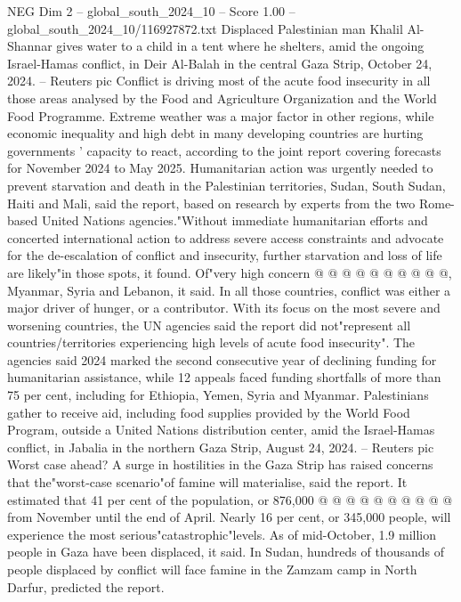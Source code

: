 \begin{textsample}{NEG Dim 2 – global\_south\_2024\_10 – Score 1.00 – global\_south\_2024\_10/116927872.txt}  \label{ex:f2_neg_414}
Displaced Palestinian man Khalil Al-Shannar gives water to a child in a tent where he shelters, amid the ongoing Israel-Hamas conflict, in Deir Al-Balah in the central Gaza Strip, October 24, 2024. -- Reuters pic Conflict is driving most of the acute food insecurity in all those areas analysed by the Food and Agriculture Organization and the World Food Programme.
Extreme weather was a major factor in other regions, while economic inequality and high debt in many developing countries are hurting governments ' capacity to react, according to the joint report covering forecasts for November 2024 to May 2025.
Humanitarian action was urgently needed to prevent starvation and death in the Palestinian territories, Sudan, South Sudan, Haiti and Mali, said the report, based on research by experts from the two Rome-based United Nations agencies."Without immediate humanitarian efforts and concerted international action to address severe access constraints and advocate for the de-escalation of conflict and insecurity, further starvation and loss of life are likely"in those spots, it found.
Of"very high concern @ @ @ @ @ @ @ @ @ @, Myanmar, Syria and Lebanon, it said.
In all those countries, conflict was either a major driver of hunger, or a contributor.
With its focus on the most severe and worsening countries, the UN agencies said the report did not"represent all countries/territories experiencing high levels of acute food insecurity".
The agencies said 2024 marked the second consecutive year of declining funding for humanitarian assistance, while 12 appeals faced funding shortfalls of more than 75 per cent, including for Ethiopia, Yemen, Syria and Myanmar.
Palestinians gather to receive aid, including food supplies provided by the World Food Program, outside a United Nations distribution center, amid the Israel-Hamas conflict, in Jabalia in the northern Gaza Strip, August 24, 2024. -- Reuters pic Worst case ahead?
A surge in hostilities in the Gaza Strip has raised concerns that the"worst-case scenario"of famine will materialise, said the report.
It estimated that 41 per cent of the population, or 876,000 @ @ @ @ @ @ @ @ @ @ from November until the end of April.
Nearly 16 per cent, or 345,000 people, will experience the most serious"catastrophic"levels.
As of mid-October, 1.9 million people in Gaza have been displaced, it said.
In Sudan, hundreds of thousands of people displaced by conflict will face famine in the Zamzam camp in North Darfur, predicted the report.

\end{textsample}
